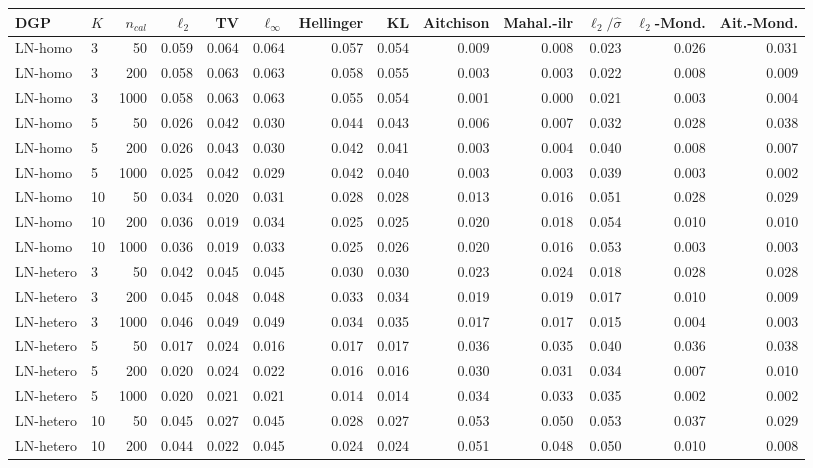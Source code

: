 \begin{tabular}{llrrrrrrrrrrr}
\toprule
DGP & $K$ & $n_{cal}$ & $\ell_2$ & TV & $\ell_\infty$ & Hellinger & KL & Aitchison & Mahal.-ilr & $\ell_2/\hat\sigma$ & $\ell_2$-Mond. & Ait.-Mond. \\
\midrule
LN-homo & 3 & 50 & 0.059 & 0.064 & 0.064 & 0.057 & 0.054 & 0.009 & 0.008 & 0.023 & 0.026 & 0.031 \\
LN-homo & 3 & 200 & 0.058 & 0.063 & 0.063 & 0.058 & 0.055 & 0.003 & 0.003 & 0.022 & 0.008 & 0.009 \\
LN-homo & 3 & 1000 & 0.058 & 0.063 & 0.063 & 0.055 & 0.054 & 0.001 & 0.000 & 0.021 & 0.003 & 0.004 \\
LN-homo & 5 & 50 & 0.026 & 0.042 & 0.030 & 0.044 & 0.043 & 0.006 & 0.007 & 0.032 & 0.028 & 0.038 \\
LN-homo & 5 & 200 & 0.026 & 0.043 & 0.030 & 0.042 & 0.041 & 0.003 & 0.004 & 0.040 & 0.008 & 0.007 \\
LN-homo & 5 & 1000 & 0.025 & 0.042 & 0.029 & 0.042 & 0.040 & 0.003 & 0.003 & 0.039 & 0.003 & 0.002 \\
LN-homo & 10 & 50 & 0.034 & 0.020 & 0.031 & 0.028 & 0.028 & 0.013 & 0.016 & 0.051 & 0.028 & 0.029 \\
LN-homo & 10 & 200 & 0.036 & 0.019 & 0.034 & 0.025 & 0.025 & 0.020 & 0.018 & 0.054 & 0.010 & 0.010 \\
LN-homo & 10 & 1000 & 0.036 & 0.019 & 0.033 & 0.025 & 0.026 & 0.020 & 0.016 & 0.053 & 0.003 & 0.003 \\
\midrule
LN-hetero & 3 & 50 & 0.042 & 0.045 & 0.045 & 0.030 & 0.030 & 0.023 & 0.024 & 0.018 & 0.028 & 0.028 \\
LN-hetero & 3 & 200 & 0.045 & 0.048 & 0.048 & 0.033 & 0.034 & 0.019 & 0.019 & 0.017 & 0.010 & 0.009 \\
LN-hetero & 3 & 1000 & 0.046 & 0.049 & 0.049 & 0.034 & 0.035 & 0.017 & 0.017 & 0.015 & 0.004 & 0.003 \\
LN-hetero & 5 & 50 & 0.017 & 0.024 & 0.016 & 0.017 & 0.017 & 0.036 & 0.035 & 0.040 & 0.036 & 0.038 \\
LN-hetero & 5 & 200 & 0.020 & 0.024 & 0.022 & 0.016 & 0.016 & 0.030 & 0.031 & 0.034 & 0.007 & 0.010 \\
LN-hetero & 5 & 1000 & 0.020 & 0.021 & 0.021 & 0.014 & 0.014 & 0.034 & 0.033 & 0.035 & 0.002 & 0.002 \\
LN-hetero & 10 & 50 & 0.045 & 0.027 & 0.045 & 0.028 & 0.027 & 0.053 & 0.050 & 0.053 & 0.037 & 0.029 \\
LN-hetero & 10 & 200 & 0.044 & 0.022 & 0.045 & 0.024 & 0.024 & 0.051 & 0.048 & 0.050 & 0.010 & 0.008 \\

\end{tabular}
